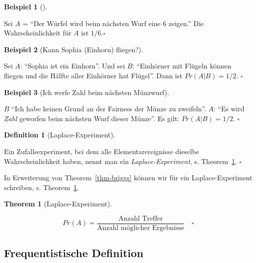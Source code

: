 \documentclass[
  ngerman,
  letterpaper,
  twoside,
  open=any]{scrbook}
\theoremstyle{definition}
\newtheorem{example}{Beispiel}[chapter]
\theoremstyle{plain}
\newtheorem{theorem}{Theorem}[chapter]
\theoremstyle{definition}
\theoremstyle{definition}
\newtheorem{definition}{Definition}[chapter]
\theoremstyle{definition}
\newtheorem{example}{Beispiel}[chapter]
\theoremstyle{definition}
\theoremstyle{remark}
\begin{document}
\begin{example}[]\protect\hypertarget{exm-briggs}{}\label{exm-briggs}

Sei \(A\) = \enquote{Der Würfel wird beim nächsten Wurf eine 6 zeigen.}
Die Wahrscheinlichkeit für \(A\) ist \(1/6. \square\)

\end{example}

\begin{example}[Kann Sophia (Einhorn)
fliegen?]\protect\hypertarget{exm-prob}{}\label{exm-prob}

Sei \(A\): \enquote{Sophia ist ein Einhorn}. Und sei \(B\):
\enquote{Einhörner mit Flügeln können fliegen und die Hälfte aller
Einhörner hat Flügel}. Dann ist \(Pr(A|B) = 1/2\). \(\square\)

\end{example}

\begin{example}[Ich werfe Zahl beim nächsten
Münzwurf]\protect\hypertarget{exm-prob3}{}\label{exm-prob3}

\(B\) \enquote{Ich habe keinen Grund an der Fairness der Münze zu
zweifeln}. \(A\): \enquote{Es wird \emph{Zahl} geworfen beim nächsten
Wurf dieser Münze}. Es gilt: \(Pr(A|B) = 1/2\). \(\square\)

\end{example}

\begin{definition}[Laplace-Experiment]\protect\hypertarget{def-laplace}{}\label{def-laplace}

Ein Zufallsexperiment, bei dem alle Elementarereignisse dieselbe
Wahrscheinlichkeit haben, nennt man ein \emph{Laplace-Experiment}, s.
Theorem~\ref{thm-laplace}. \(\square\)

\end{definition}

In Erweiterung von Theorem~\ref{thm-briggs} können wir für ein
Laplace-Experiment schreiben, s. Theorem~\ref{thm-laplace}.

\begin{theorem}[Laplace-Experiment]\protect\hypertarget{thm-laplace}{}\label{thm-laplace}

\[Pr(A)=\frac{\text{Anzahl Treffer}}{\text{Anzahl möglicher Ergebnisse}} \quad \square\]

\end{theorem}

\subsection{Frequentistische
Definition}\label{frequentistische-definition}
\end{document}
